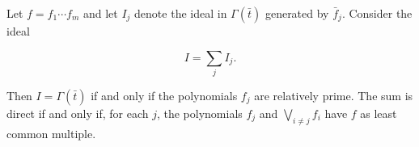 Let $f = f_1 \cdots f_m$ and let $I_j$ denote the ideal in $\Gamma(\bar{t})$ generated by $\bar{f}_j$. Consider the ideal

$$I = \sum_j I_j.$$

Then $I = \Gamma(\bar{t})$ if and only if the polynomials $f_j$ are relatively prime. The sum is direct if and only if, for each $j$, the polynomials $f_j$ and $\bigvee_{i \neq j} f_i$ have $f$ as least common multiple.

